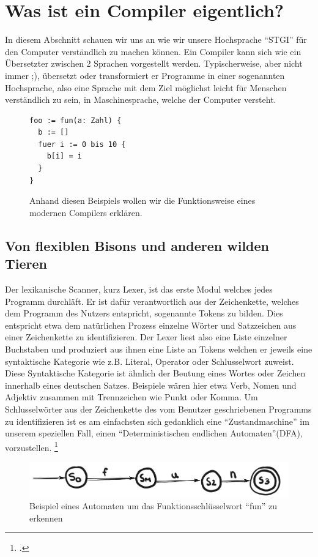 \documentclass[a4paper, 12pt]{article}
\begin{document}
\newpage
\section{Was ist ein Compiler eigentlich?}

In diesem Abschnitt schauen wir uns an wie wir unsere Hochsprache “STGI”
f\"ur den Computer verst\"andlich zu machen k\"onnen. Ein Compiler kann sich wie ein \"Ubersetzter zwischen 2 Sprachen vorgestellt
werden. Typischerweise, aber nicht immer ;)\cite{eso}, \"ubersetzt oder transformiert er Programme in einer
sogenannten Hochsprache, also eine Sprache mit dem Ziel m\"oglichst leicht
f\"ur Menschen verst\"andlich zu sein, in Maschinesprache, welche der Computer
versteht.

\begin{figure}[h]
  \caption{Anhand diesen Beispiels wollen wir die Funktionsweise eines
modernen Compilers erkl\"aren.}
\begin{verbatim}
foo := fun(a: Zahl) {
  b := []
  fuer i := 0 bis 10 {
    b[i] = i
  }
}
\end{verbatim}
\end{figure}

\subsection{Von flexiblen Bisons und anderen wilden Tieren}
Der lexikanische Scanner, kurz Lexer, ist das erste Modul welches jedes Programm durchl\"aft. Er ist daf\"ur verantwortlich aus der Zeichenkette, welches dem Programm des Nutzers
entspricht, sogenannte Tokens zu bilden. Dies entspricht etwa dem nat\"urlichen
Prozess einzelne W\"orter und Satzzeichen aus einer Zeichenkette zu identifizieren. Der Lexer liest also eine Liste einzelner Buchstaben und produziert
aus ihnen eine Liste an Tokens welchen er jeweils eine syntaktische Kategorie wie z.B. Literal, Operator oder Schlusselwort zuweist. Diese Syntaktische
Kategorie ist \"ahnlich der Beutung eines Wortes oder Zeichen innerhalb eines
deutschen Satzes. Beispiele w\"aren hier etwa Verb, Nomen und Adjektiv zusammen mit Trennzeichen wie Punkt oder Komma. Um Schlusselw\"orter aus
der Zeichenkette des vom Benutzer geschriebenen Programms zu identifizieren
ist es am einfachsten sich gedanklich eine “Zustandmaschine” im unserem speziellen Fall,
einen “Deterministischen endlichen Automaten”(DFA), vorzustellen. \footcite[vgl][23]{eac}

\begin{figure}[h]
    \caption{Beispiel eines Automaten um das Funktionsschl\"usselwort ``fun'' zu erkennen}
    \includegraphics[scale=0.4]{dfa-fun}
\end{figure}
\end{document}
